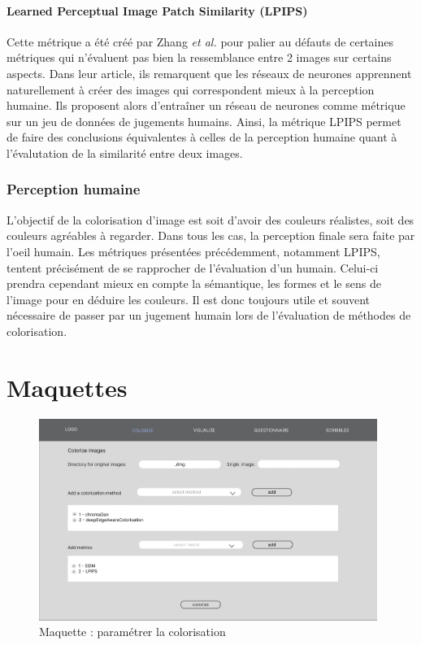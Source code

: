 \documentclass{article}
\begin{document}
\paragraph{Learned Perceptual Image Patch Similarity (LPIPS)}
Cette métrique a été créé par Zhang \textit{et al.} \cite{journals/corr/abs-1801-03924}  pour palier au défauts de certaines métriques qui n'évaluent pas bien la ressemblance entre 2 images sur certains aspects.
Dans leur article, ils remarquent que les réseaux de neurones apprennent naturellement à créer des images qui correspondent mieux à la perception humaine.
Ils proposent alors d'entraîner un réseau de neurones comme métrique sur un jeu de données de jugements humains.
Ainsi, la métrique LPIPS permet de faire des conclusions équivalentes à celles de la perception humaine
quant à l'évalutation de la similarité entre deux images.

\subsubsection{Perception humaine}

L'objectif de la colorisation d'image est soit d'avoir des couleurs réalistes, soit des couleurs agréables à regarder. 
Dans tous les cas, la perception finale sera faite par l'oeil humain. 
Les métriques présentées précédemment, notamment LPIPS, tentent précisément de se rapprocher de l'évaluation d'un humain. 
Celui-ci prendra cependant mieux en compte la sémantique, les formes et le sens de l'image pour en déduire les couleurs.
Il est donc toujours utile et souvent nécessaire de passer par un jugement humain lors de l'évaluation de méthodes de colorisation.

\section{Maquettes}\label{sec:annexe-maquette}
\begin{figure}[htp]
    \centering
    \includegraphics[width=11cm]{coloriser-parametrage1.png}
    \caption{Maquette : paramétrer la colorisation}
    \label{fig:maquette-coloriser-parametrage1}
\end{figure}
\end{document}
